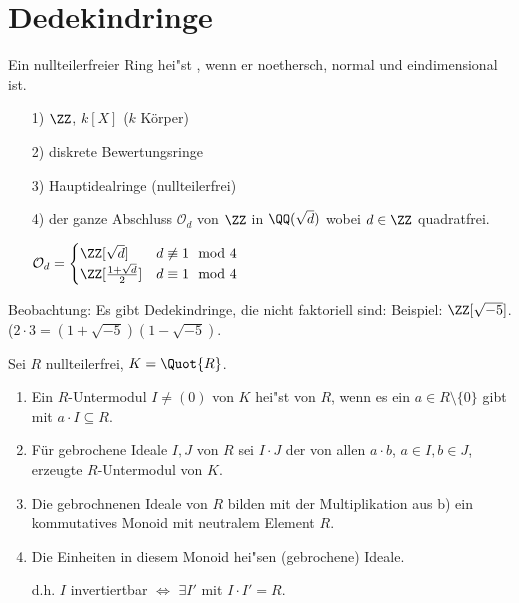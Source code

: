 \section{Dedekindringe}

\begin{Def}

Ein nullteilerfreier Ring hei"st , wenn er noethersch, normal und eindimensional ist.

\begin{nnBsp}
\begin{enumerate}
\item[1)] $\ZZ$, $k[X]$ ($k$ K\"orper)

\item[2)] diskrete Bewertungsringe

\item[3)] Hauptidealringe (nullteilerfrei)

\item[4)] der ganze Abschluss $\mathcal{O}_d$ von $\ZZ$ in $\QQ(\sqrt{d})$ wobei $d \in \ZZ$ quadratfrei.

$\mathcal{O}_d = \begin{cases}
\ZZ[\sqrt{d}] & d \not\equiv 1 \mod 4\\
\ZZ[\frac{1+\sqrt{d}}{2}] & d \equiv 1 \mod 4
\end{cases}$

\end{enumerate}
\end{nnBsp}

\end{Def}

Beobachtung: Es gibt Dedekindringe, die nicht faktoriell sind: Beispiel:
$\ZZ[\sqrt{-5}]$. ($2 \cdot 3 = (1 + \sqrt{-5}) (1 - \sqrt{-5})$.

\begin{DefBem}
Sei $R$ nullteilerfrei, $K = \Quot{R}$.
\begin{enumerate}
\item Ein $R$-Untermodul $I \neq (0)$ von $K$ hei"st  von $R$, wenn es ein $a \in R \setminus \{0\}$ gibt mit $a \cdot I \subseteq R$.

\item F\"ur gebrochene Ideale $I,J$ von $R$ sei $I \cdot J$ der von allen $a \cdot b$, $a \in I, b \in J$, erzeugte $R$-Untermodul von $K$.

\item Die gebrochnenen Ideale von $R$ bilden mit der Multiplikation aus b) ein kommutatives Monoid mit neutralem Element $R$.

\item Die Einheiten in diesem Monoid hei"sen  (gebrochene) Ideale.

d.h. $I$ invertiertbar $\Leftrightarrow$ $\exists I'$ mit $I \cdot I' = R$.

\end{enumerate}
\end{DefBem}

